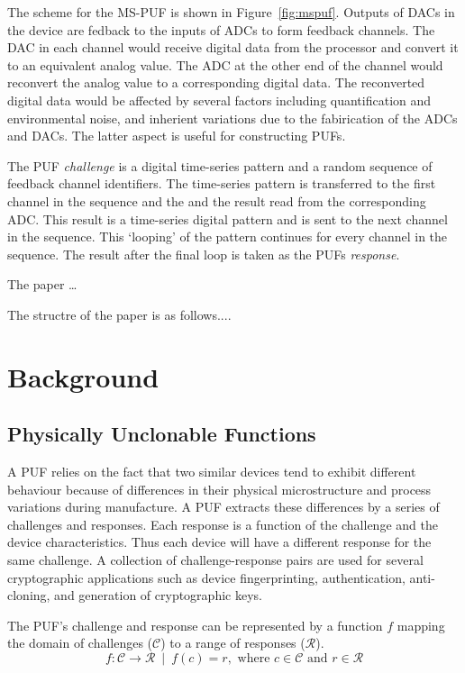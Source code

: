 The scheme for the MS-PUF is shown in Figure~\ref{fig:mspuf}. Outputs of DACs in the device
are fedback to the inputs of ADCs to form feedback channels. 
The DAC in each channel would receive digital data from the processor and convert it
to an equivalent analog value. The ADC at the other end of the channel would reconvert
the analog value to a corresponding digital data. The reconverted digital data would 
be affected by several factors including quantification and environmental noise,
and inherient variations due to the fabirication of the ADCs and DACs. The latter
aspect is useful for constructing PUFs.


The PUF {\em challenge} is a 
digital time-series pattern and a random sequence of feedback channel identifiers. 
The time-series pattern is transferred to the first channel in the sequence and the 
and the result read from the corresponding ADC. This result is a time-series 
digital pattern and is sent to the next channel in the sequence. This `looping' of the
pattern continues for every channel in the sequence. The result after the final loop
is taken as the PUFs {\em response}. 

The paper \ldots


The structre of the paper is as follows....

%
%

\section{Background}
\subsection{Physically Unclonable Functions}
A PUF relies on the fact that two similar devices tend to exhibit
different behaviour because of differences in their physical microstructure
and process variations during manufacture. A PUF extracts these 
differences by a 
series of challenges and responses. Each response is a 
function of the challenge and the device characteristics. Thus each device will
have a different response for the same challenge. A collection of challenge-response pairs
are used for several cryptographic applications such as device fingerprinting, 
authentication, anti-cloning, and generation of cryptographic keys.


The PUF's challenge and response can be represented by a function $f$ 
mapping the domain of challenges ($\mathcal C$) to a range of responses ($\mathcal R$).
\begin{equation*}
f : \mathcal C \rightarrow \mathcal R \,\,\,
  | \,\,\, f(c) = r, \text{ where } c \in \mathcal C \text{ and } r \in \mathcal R
\end{equation*}

